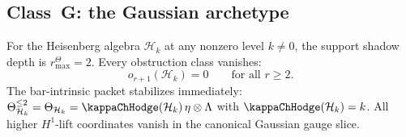 
\subsection{Class~G: the Gaussian archetype}

\begin{theorem}[$r^\Theta_{\max}(\mathcal{H}_k) = 2$]
For the Heisenberg algebra $\mathcal{H}_k$ at any nonzero
level $k \neq 0$, the support shadow depth is
\(r^\Theta_{\max}=2\).
Every obstruction class vanishes:
\begin{equation}%
o_{r+1}(\mathcal{H}_k) = 0
\qquad \text{for all } r \geq 2.
\end{equation}
The bar-intrinsic packet stabilizes immediately:
$\Theta_{\mathcal{H}_k}^{\leq 2} = \Theta_{\mathcal{H}_k}
= \kappaChHodge(\mathcal{H}_k)\,\eta \otimes \Lambda$ with
\(\kappaChHodge(\mathcal{H}_k) = k\).  All higher
\(H^1\)-lift coordinates vanish in the canonical Gaussian gauge slice.
\end{theorem}

